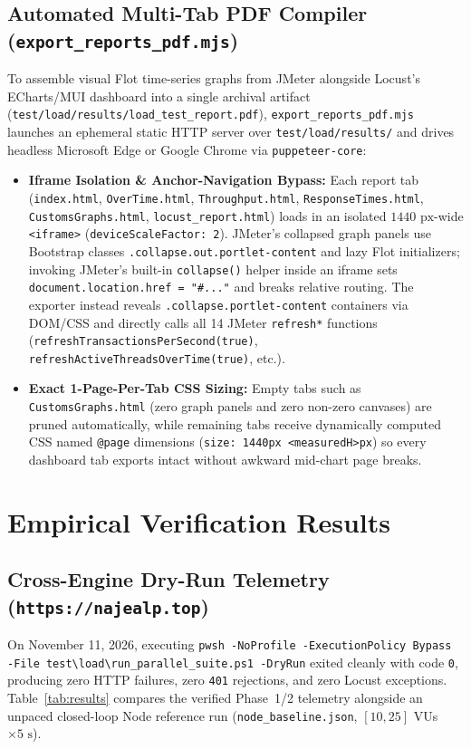 \documentclass[11pt,letterpaper]{article}
\begin{document}
\subsection{Automated Multi-Tab PDF Compiler (\texttt{export\_reports\_pdf.mjs})}
To assemble visual Flot time-series graphs from JMeter alongside Locust's ECharts/MUI dashboard into a single archival artifact (\texttt{test/load/results/load\_test\_report.pdf}), \texttt{export\_reports\_pdf.mjs} launches an ephemeral static HTTP server over \texttt{test/load/results/} and drives headless Microsoft Edge or Google Chrome via \texttt{puppeteer-core}:
\begin{itemize}
  \item \textbf{Iframe Isolation \& Anchor-Navigation Bypass:} Each report tab (\texttt{index.html}, \texttt{OverTime.html}, \texttt{Throughput.html}, \texttt{ResponseTimes.html}, \texttt{CustomsGraphs.html}, \texttt{locust\_report.html}) loads in an isolated $1440\text{ px}$-wide \texttt{<iframe>} (\texttt{deviceScaleFactor: 2}). JMeter's collapsed graph panels use Bootstrap classes \texttt{.collapse.out.portlet-content} and lazy Flot initializers; invoking JMeter's built-in \texttt{collapse()} helper inside an iframe sets \texttt{document.location.href = "\#..."} and breaks relative routing. The exporter instead reveals \texttt{.collapse.portlet-content} containers via DOM/CSS and directly calls all 14 JMeter \texttt{refresh*} functions (\texttt{refreshTransactionsPerSecond(true)}, \texttt{refreshActiveThreadsOverTime(true)}, etc.).
  \item \textbf{Exact 1-Page-Per-Tab CSS Sizing:} Empty tabs such as \texttt{CustomsGraphs.html} (zero graph panels and zero non-zero canvases) are pruned automatically, while remaining tabs receive dynamically computed CSS named \texttt{@page} dimensions (\texttt{size: 1440px <measuredH>px}) so every dashboard tab exports intact without awkward mid-chart page breaks.
\end{itemize}

\section{Empirical Verification Results}

\subsection{Cross-Engine Dry-Run Telemetry (\texttt{https://najealp.top})}
On November 11, 2026, executing \texttt{pwsh -NoProfile -ExecutionPolicy Bypass -File test\textbackslash load\textbackslash run\_parallel\_suite.ps1 -DryRun} exited cleanly with code \texttt{0}, producing zero HTTP failures, zero \texttt{401} rejections, and zero Locust exceptions. Table~\ref{tab:results} compares the verified Phase~1/2 telemetry alongside an unpaced closed-loop Node reference run (\texttt{node\_baseline.json}, $[10, 25]$ VUs $\times 5\text{ s}$).
\end{document}
